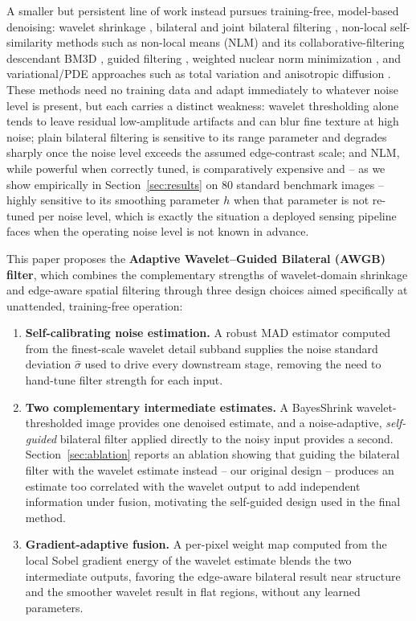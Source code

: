 \documentclass[final,3p,times,twocolumn,nopreprintline]{elsarticle}
\begin{document}
A smaller but persistent line of work instead pursues training-free, model-based denoising: wavelet shrinkage \cite{donoho1994ideal,chang2000adaptive}, bilateral and joint bilateral filtering \cite{tomasi1998bilateral,petschnigg2004digital}, non-local self-similarity methods such as non-local means (NLM) \cite{buades2005non} and its collaborative-filtering descendant BM3D \cite{dabov2007image}, guided filtering \cite{he2013guided}, weighted nuclear norm minimization \cite{gu2014weighted}, and variational/PDE approaches such as total variation \cite{rudin1992nonlinear} and anisotropic diffusion \cite{perona1990scale}. These methods need no training data and adapt immediately to whatever noise level is present, but each carries a distinct weakness: wavelet thresholding alone tends to leave residual low-amplitude artifacts and can blur fine texture at high noise; plain bilateral filtering is sensitive to its range parameter and degrades sharply once the noise level exceeds the assumed edge-contrast scale; and NLM, while powerful when correctly tuned, is comparatively expensive and -- as we show empirically in Section~\ref{sec:results} on 80 standard benchmark images -- highly sensitive to its smoothing parameter $h$ when that parameter is not re-tuned per noise level, which is exactly the situation a deployed sensing pipeline faces when the operating noise level is not known in advance.

This paper proposes the \textbf{Adaptive Wavelet--Guided Bilateral (AWGB) filter}, which combines the complementary strengths of wavelet-domain shrinkage and edge-aware spatial filtering through three design choices aimed specifically at unattended, training-free operation:

\begin{enumerate}
    \item \textbf{Self-calibrating noise estimation.} A robust MAD estimator computed from the finest-scale wavelet detail subband \cite{donoho1995noising} supplies the noise standard deviation $\hat\sigma$ used to drive every downstream stage, removing the need to hand-tune filter strength for each input.
    \item \textbf{Two complementary intermediate estimates.} A BayesShrink wavelet-thresholded image \cite{chang2000adaptive} provides one denoised estimate, and a noise-adaptive, \emph{self-guided} bilateral filter \cite{tomasi1998bilateral} applied directly to the noisy input provides a second. Section~\ref{sec:ablation} reports an ablation showing that guiding the bilateral filter with the wavelet estimate instead -- our original design -- produces an estimate too correlated with the wavelet output to add independent information under fusion, motivating the self-guided design used in the final method.
    \item \textbf{Gradient-adaptive fusion.} A per-pixel weight map computed from the local Sobel gradient energy of the wavelet estimate blends the two intermediate outputs, favoring the edge-aware bilateral result near structure and the smoother wavelet result in flat regions, without any learned parameters.
\end{enumerate}
\end{document}
